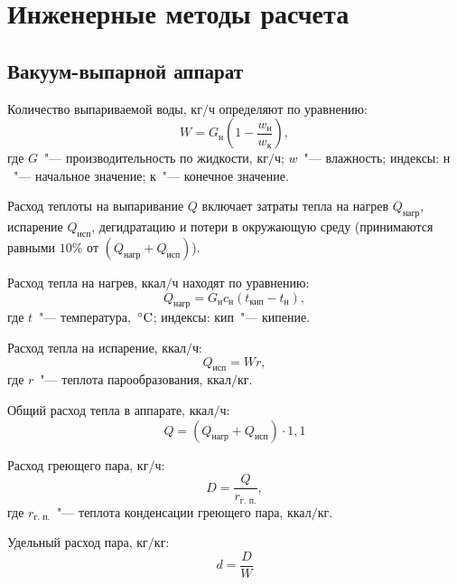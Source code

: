 \section{Инженерные методы расчета}

\subsection{Вакуум-выпарной аппарат}\label{seq:calculation_vacuum}

Количество выпариваемой воды, \(\text{кг}/\text{ч}\) определяют по уравнению:
\begin{equation}
 W={G}_{\text{н}}\left(1-\frac{{w}_{\text{н}}}{{w}_{\text{к}}}\right), 
\end{equation}
где \({G}\)~"--- производительность по жидкости, \(\text{кг}/\text{ч}\); \(w\)~"--- влажность; индексы: \(\text{н}\)~"--- начальное значение; \(\text{к}\)~"---
конечное значение.

Расход теплоты на выпаривание \(Q\) включает затраты тепла на нагрев \(Q_{\text{нагр}}\), испарение \(Q_{\text{исп}}\), дегидратацию и потери в окружающую
среду (принимаются равными \(10\)\% от \(\left(Q_{\text{нагр}} + Q_{\text{исп}}\right)\)).

Расход тепла на нагрев, \(\text{ккал}/\text{ч}\) находят по уравнению:
\begin{equation}
 {Q}_{\text{нагр}}={G}_{\text{н}}{c}_{\text{н}}\left({t}_{\text{кип}}-{t}_{\text{н}}\right),
\end{equation}
где \(t\)~"--- температура, \(\,^{\circ}\mathrm{C}\); индексы: \(\text{кип}\)~"--- кипение.

Расход тепла на испарение, \(\text{ккал}/\text{ч}\):
\begin{equation}
 {Q}_{\text{исп}}=Wr,
\end{equation}
где \(r\)~"--- теплота парообразования, \(\text{ккал}/\text{кг}\).

Общий расход тепла в аппарате, \(\text{ккал}/\text{ч}\):
\begin{equation}
 Q=\left({Q}_{\text{нагр}}+{Q}_{\text{исп}}\right)\cdot 1,1 
\end{equation}

Расход греющего пара, \(\text{кг}/\text{ч}\):
\begin{equation}
D=\frac{Q}{{r}_{\text{г. п.}}},
\end{equation}
где \({r}_{\text{г. п.}}\)~"--- теплота конденсации греющего пара, \(\text{ккал}/\text{кг}\).

Удельный расход пара, \(\text{кг}/\text{кг}\):
\begin{equation}
 d=\frac{D}{W} 
\end{equation}

